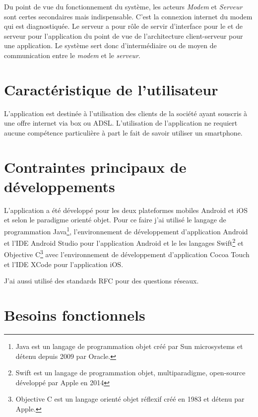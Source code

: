 Du point de vue du fonctionnement du système, les acteurs \emph{Modem} et \emph{Serveur} sont certes secondaires mais indispensable. C'est la connexion internet du modem qui est diagnostiquée. Le serveur a pour rôle de servir d'interface pour le \hd et de serveur pour l'application du point de vue de l'architecture client-serveur pour une application. Le système sert donc d'intermédiaire ou de moyen de communication entre le \emph{modem} et le \emph{serveur}.

\section{Caractéristique de l'utilisateur}
L'application est destinée à l'utilisation des clients de la société \lol ayant souscris à une offre internet via box ou ADSL. L'utilisation de l'application ne requiert aucune compétence particulière à part le fait de savoir utiliser un smartphone.

\section{Contraintes principaux de développements}
L'application a été développé pour les deux plateformes mobiles Android et iOS et selon le paradigme orienté objet. Pour ce faire j'ai utilisé le langage de programmation Java\footnote{Java est un langage de programmation objet créé par Sun microsystems et détenu depuis 2009 par Oracle. }, l'environnement de  développement d'application Android et l'IDE Android Studio pour l'application Android et le les langages Swift\footnote{Swift est un langage de programmation objet, multiparadigme, open-source développé par Apple en 2014 } et Objective C\footnote{Objective C est un langage orienté objet réflexif créé en 1983 et détenu par Apple.} avec l'environnement de développement d'application Cocoa Touch et l'IDE XCode pour l'application iOS. 

J'ai aussi utilisé des standards RFC pour des questions réseaux.

\section{Besoins fonctionnels}

